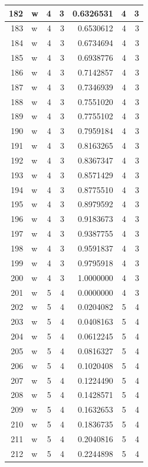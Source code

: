 \documentclass[
  letterpaper,
  DIV=11,
  numbers=noendperiod]{scrreprt}
\begin{document}
\begin{table}
\begin{tabular}[t]{r|l|r|r|r|r|r}
\hline
182 & w & 4 & 3 & 0.6326531 & 4 & 3\\
\hline
183 & w & 4 & 3 & 0.6530612 & 4 & 3\\
\hline
184 & w & 4 & 3 & 0.6734694 & 4 & 3\\
\hline
185 & w & 4 & 3 & 0.6938776 & 4 & 3\\
\hline
186 & w & 4 & 3 & 0.7142857 & 4 & 3\\
\hline
187 & w & 4 & 3 & 0.7346939 & 4 & 3\\
\hline
188 & w & 4 & 3 & 0.7551020 & 4 & 3\\
\hline
189 & w & 4 & 3 & 0.7755102 & 4 & 3\\
\hline
190 & w & 4 & 3 & 0.7959184 & 4 & 3\\
\hline
191 & w & 4 & 3 & 0.8163265 & 4 & 3\\
\hline
192 & w & 4 & 3 & 0.8367347 & 4 & 3\\
\hline
193 & w & 4 & 3 & 0.8571429 & 4 & 3\\
\hline
194 & w & 4 & 3 & 0.8775510 & 4 & 3\\
\hline
195 & w & 4 & 3 & 0.8979592 & 4 & 3\\
\hline
196 & w & 4 & 3 & 0.9183673 & 4 & 3\\
\hline
197 & w & 4 & 3 & 0.9387755 & 4 & 3\\
\hline
198 & w & 4 & 3 & 0.9591837 & 4 & 3\\
\hline
199 & w & 4 & 3 & 0.9795918 & 4 & 3\\
\hline
200 & w & 4 & 3 & 1.0000000 & 4 & 3\\
\hline
201 & w & 5 & 4 & 0.0000000 & 4 & 3\\
\hline
202 & w & 5 & 4 & 0.0204082 & 5 & 4\\
\hline
203 & w & 5 & 4 & 0.0408163 & 5 & 4\\
\hline
204 & w & 5 & 4 & 0.0612245 & 5 & 4\\
\hline
205 & w & 5 & 4 & 0.0816327 & 5 & 4\\
\hline
206 & w & 5 & 4 & 0.1020408 & 5 & 4\\
\hline
207 & w & 5 & 4 & 0.1224490 & 5 & 4\\
\hline
208 & w & 5 & 4 & 0.1428571 & 5 & 4\\
\hline
209 & w & 5 & 4 & 0.1632653 & 5 & 4\\
\hline
210 & w & 5 & 4 & 0.1836735 & 5 & 4\\
\hline
211 & w & 5 & 4 & 0.2040816 & 5 & 4\\
\hline
212 & w & 5 & 4 & 0.2244898 & 5 & 4\\

\end{tabular}
\end{table}
\end{document}
